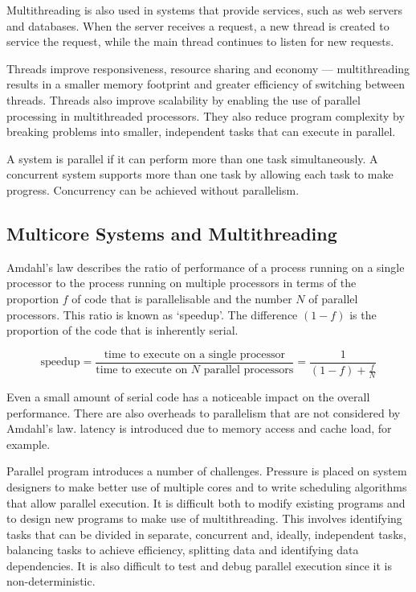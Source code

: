 Multithreading is also used in systems that provide services, such as web servers and databases.
When the server receives a request, a new thread is created to service the request, while the main thread continues to listen for new requests.

Threads improve responsiveness, resource sharing and economy --- multithreading results in a smaller memory footprint and greater efficiency of switching between threads.
Threads also improve scalability by enabling the use of parallel processing in multithreaded processors.
They also reduce program complexity by breaking problems into smaller, independent tasks that can execute in parallel.

A system is parallel if it can perform more than one task simultaneously.
A concurrent system supports more than one task by allowing each task to make progress.
Concurrency can be achieved without parallelism.

\subsection{Multicore Systems and Multithreading}

Amdahl's law describes the ratio of performance of a process running on a single processor to the process running on multiple processors in terms of the proportion \(f\) of code that is parallelisable and the number \(N\) of parallel processors.
This ratio is known as `speedup'.
The difference \(\left(1 - f\right)\) is the proportion of the code that is inherently serial.

\begin{equation*}
  \text{speedup} = \frac{\text{time to execute on a single processor}}{\text{time to execute on \(N\) parallel processors}} = \frac{1}{\left(1 - f\right) + \frac{f}{N}}
\end{equation*}

Even a small amount of serial code has a noticeable impact on the overall performance.
There are also overheads to parallelism that are not considered by Amdahl's law.
latency is introduced due to memory access and cache load, for example.

Parallel program introduces a number of challenges.
Pressure is placed on system designers to make better use of multiple cores and to write scheduling algorithms that allow parallel execution.
It is difficult both to modify existing programs and to design new programs to make use of multithreading.
This involves identifying tasks that can be divided in separate, concurrent and, ideally, independent tasks, balancing tasks to achieve efficiency, splitting data and identifying data dependencies.
It is also difficult to test and debug parallel execution since it is non-deterministic.

